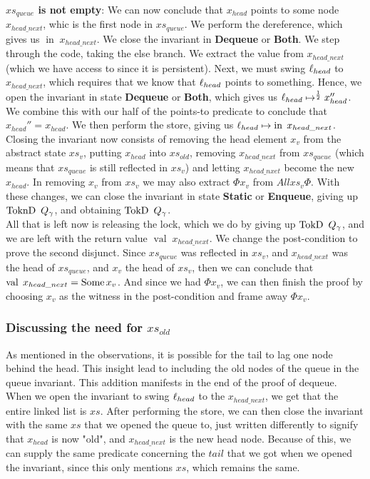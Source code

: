 \documentclass[twoside,11pt,openright]{report}
\newcommand{\nIn}[1]{\operatorname{in} \; #1}
\newcommand{\nVal}[1]{\operatorname{val} \; #1}
\newcommand{\StaticState}{\textbf{Static}}
\newcommand{\EnqueueState}{\textbf{Enqueue}}
\newcommand{\DequeueState}{\textbf{Dequeue}}
\newcommand{\BothState}{\textbf{Both}}
\newcommand{\Qg}{Q_\gname}
\newcommand{\TokD}[1]{\operatorname{TokD}\ #1}
\newcommand{\TokDQg}{\TokD{\Qg}}
\newcommand{\ToknD}[1]{\operatorname{ToknD}\ #1}
\newcommand{\ToknDQg}{\ToknD{\Qg}}
\begin{document}
\textbf{$xs_{queue}$ is not empty}:
We can now conclude that $x_{head}$ points to some node $x_{head\_next}$, whic is the first node in $xs_{queue}$. We perform the dereference, which gives us $\nIn{x_{head\_next}}$. We close the invariant in \DequeueState{} or \BothState{}. We step through the code, taking the else branch. We extract the value from $x_{head\_next}$ (which we have access to since it is persistent). Next, we must swing $\ell_{head}$ to $x_{head\_next}$, which requires that we know that $\ell_{head}$ points to something. Hence, we open the invariant in state \DequeueState{} or \BothState{}, which gives us $\ell_{head} \mapsto^{\frac{1}{2}} x_{head}''$. We combine this with our half of the points-to predicate to conclude that $x_{head}'' = x_{head}$. We then perform the store, giving us $\loc_{head} \mapsto \nIn{x_{head\_next}}$. Closing the invariant now consists of removing the head element $x_v$ from the abstract state $xs_v$, putting $x_{head}$ into $xs_{old}$, removing $x_{head\_next}$ from $xs_{queue}$ (which means that $xs_{queue}$ is still reflected in $xs_{v}$) and letting $x_{head\_nxet}$ become the new $x_{head}$. In removing $x_v$ from $xs_v$ we may also extract $\Phi x_v$ from $All xs_v \Phi$. With these changes, we can close the invariant in state \StaticState{} or \EnqueueState{}, giving up $\ToknDQg$, and obtaining $\TokDQg$.\\
All that is left now is releasing the lock, which we do by giving up $\TokDQg$, and we are left with the return value $\nVal{x_{head\_next}}$. We change the post-condition to prove the second disjunct. Since $xs_{queue}$ was reflected in $xs_v$, and $x_{head\_next}$ was the head of $xs_{queue}$, and $x_v$ the head of $xs_v$, then we can conclude that $\nVal{x_{head\_next}} = \Some x_v$. And since we had $\Phi x_v$, we can then finish the proof by choosing $x_v$ as the witness in the post-condition and frame away $\Phi x_v$.

\subsubsection{Discussing the need for $xs_{old}$}\label{TLMSQ:Discussion:xs_old}

As mentioned in the observations, it is possible for the tail to lag one node behind the head. This insight lead to including the old nodes of the queue in the queue invariant. This addition manifests in the end of the proof of dequeue. When we open the invariant to swing $\ell_{head}$ to the $x_{head\_next}$, we get that the entire linked list is $xs$. After performing the store, we can then close the invariant with the same $xs$ that we opened the queue to, just written differently to signify that $x_{head}$ is now "old", and $x_{head\_next}$ is the new head node. Because of this, we can supply the same predicate concerning the $tail$ that we got when we opened the invariant, since this only mentions $xs$, which remains the same.
\end{document}
